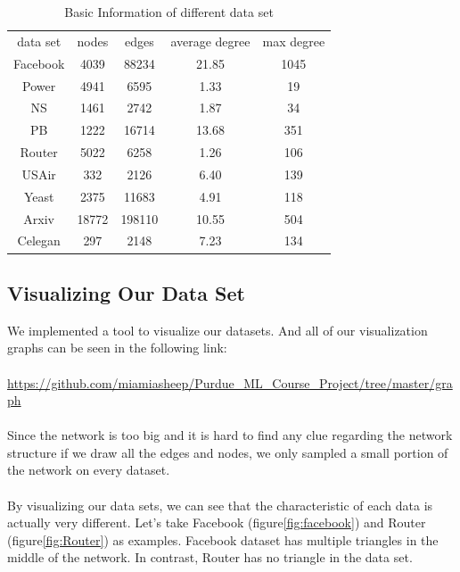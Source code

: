 \documentclass[12pt]{article}
\begin{document}
	\begin{table}
		\begin{center}
			\begin{tabular}{|c|c|c|c|c|}
				\hline
				data set & nodes & edges & average degree & max degree \\
				Facebook & 4039 & 88234 & 21.85 & 1045 \\
				Power & 4941 & 6595 & 1.33 & 19 \\
				NS & 1461 & 2742 & 1.87 & 34 \\
				PB & 1222 & 16714 & 13.68 & 351 \\
				Router & 5022 & 6258 & 1.26 & 106 \\
				USAir & 332 & 2126 & 6.40 & 139 \\
				Yeast & 2375 & 11683 & 4.91 & 118 \\
				Arxiv & 18772 & 198110 & 10.55 & 504 \\
				Celegan & 297 & 2148 & 7.23 & 134 \\
				\hline 
			\end{tabular}
			\caption{Basic Information of different data set}
			\label{tab:info}
		\end{center}
	\end{table}
	
	\subsection{Visualizing Our Data Set}
	We implemented a tool to visualize our datasets. And all of our visualization graphs can be seen in the following link:
	\\
	\\
	\url{https://github.com/miamiasheep/Purdue_ML_Course_Project/tree/master/graph}
	\\
	\\
	Since the network is too big and it is hard to find any clue regarding the network structure if we draw all the edges and nodes, we only sampled a small portion of the network on every dataset.
	\\
	\\
	By visualizing our data sets, we can see that the characteristic of each data is actually very different. Let's take Facebook (figure\ref{fig:facebook}) and Router (figure\ref{fig:Router}) as examples. Facebook dataset has multiple triangles in the middle of the network. In contrast, Router has no triangle in the data set.
	
\end{document}
